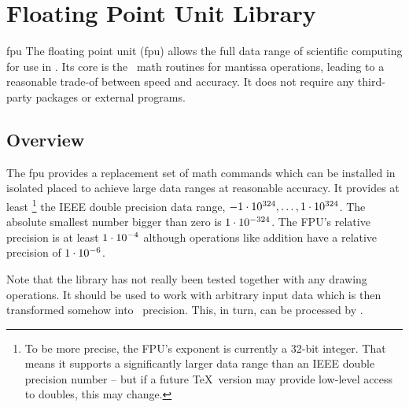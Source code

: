%
%
%


\section{Floating Point Unit Library}
\label{pgfmath-floatunit}
\label{section-library-fpu}

{}

\begingroup
{}

\begin{pgflibrary}{fpu}
    The floating point unit (fpu) allows the full data range of scientific
    computing for use in \pgfname. Its core is the \pgfname\ math routines for
    mantissa operations, leading to a reasonable trade-of between speed and
    accuracy. It does not require any third-party packages or external
    programs.
\end{pgflibrary}


\subsection{Overview}

The fpu provides a replacement set of math commands which can be installed in
isolated placed to achieve large data ranges at reasonable accuracy. It
provides at least%
    \footnote{To be more precise, the FPU's exponent is currently a 32-bit
    integer. That means it supports a significantly larger data range than an
    IEEE double precision number -- but if a future \TeX\ version may provide
    low-level access to doubles, this may change.}%
the IEEE double precision data range, $\pgfmathprintnumber{-1e+324}, \dotsc,
\pgfmathprintnumber{+1e324}$. The absolute smallest number bigger than zero is
$\pgfmathprintnumber{1e-324}$. The FPU's relative precision is at least
$\pgfmathprintnumber{1e-4}$ although operations like addition have a relative
precision of $\pgfmathprintnumber{1e-6}$.

Note that the library has not really been tested together with any drawing
operations. It should be used to work with arbitrary input data which is then
transformed somehow into \pgfname\ precision. This, in turn, can be processed
by \pgfname.


